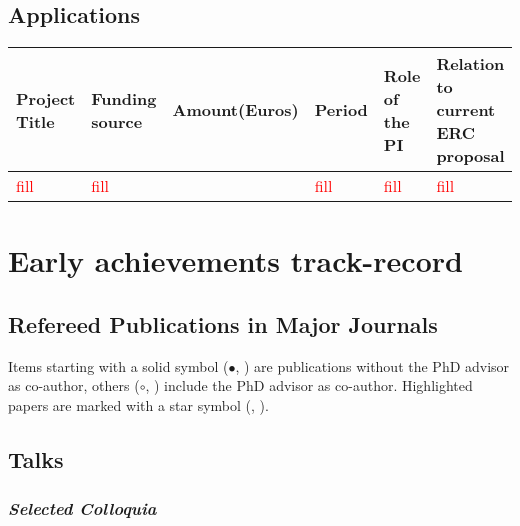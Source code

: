 \documentclass{ercgrant}
\begin{document}
\subsection*{Applications}
\begin{footnotesize}
	\def\arraystretch{1.5}
	\begin{tabular}{|p{3.9cm}|p{1.6cm}|p{1.5cm}|p{2.4cm}|p{2.7cm}|p{2.2cm}|}
		\hline
		\rowcolor{black!20} \bf Project Title & \bf  Funding source   & \bf
		Amount\newline(Euros)                 & \bf Period            & \bf Role of the PI       & \bf Relation to \newline current ERC \newline proposal                                                 \\
		\hline
		\textcolor{red}{fill}                 & \textcolor{red}{fill} & \textcolor{red}{\EUR{1}} & \textcolor{red}{fill}                                  & \textcolor{red}{fill} & \textcolor{red}{fill}
		\\
		\hline
	\end{tabular}
\end{footnotesize}

\newpage
\section{Early achievements track-record}

\subsection*{Refereed Publications in Major Journals}
Items starting with a solid symbol ($\bullet$, \fstar) are publications without the PhD advisor as
co-author, others ($\circ$, \ostar) include the PhD advisor as co-author. Highlighted papers are
marked with a star symbol (\ostar, \fstar).\\

\begin{itemize}[topsep=0pt,itemsep=0.62ex,partopsep=0ex,parsep=0.5ex]
	
\end{itemize}

\subsection*{Talks}
\subsubsection*{\textit{Selected Colloquia}}
\end{document}
